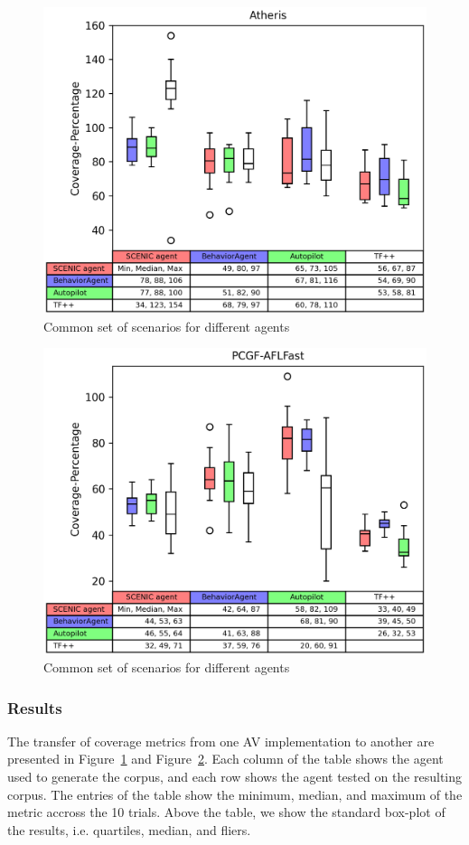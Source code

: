 

\begin{figure}
    \centering
    \includegraphics[width=0.7\linewidth]{figures/chapter5/RQ3/Atheris_traffic-rules_all-coverage_PredicateSetCoverage_Coverage-Percentage.png}
    \caption{Common set of scenarios for different agents}
    \label{fig:switch-agent_Atheris}
\end{figure}

\begin{figure}
    \centering
    \includegraphics[width=0.7\linewidth]{figures/chapter5/RQ3/PCGF_traffic-rules_all-coverage_PredicateSetCoverage_Coverage-Percentage.png}
    \caption{Common set of scenarios for different agents}
    \label{fig:switch-agent_Random}
\end{figure}

\subsubsection{Results}
The transfer of coverage metrics from one AV implementation to another are presented in Figure~\ref{fig:switch-agent_Atheris} and Figure~\ref{fig:switch-agent_Random}.
% 
Each column of the table shows the agent used to generate the corpus, and each row shows the agent tested on the resulting corpus.
%
The entries of the table show the minimum, median, and maximum of the metric accross the 10 trials.
%
Above the table, we show the standard box-plot of the results, i.e. quartiles, median, and fliers.


